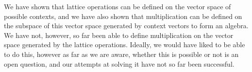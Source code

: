 




We have shown that lattice operations can be defined on the vector space of possible contexts, and we have also shown that multiplication can be defined on the subspace of this vector space generated by context vectors to form an algebra. We have not, however, so far been able to define multiplication on the vector space generated by the lattice operations. Ideally, we would have liked to be able to do this, however as far as we are aware, whether this is possible or not is an open question, and our attempts at solving it have not so far been successful.

%
%

% 
